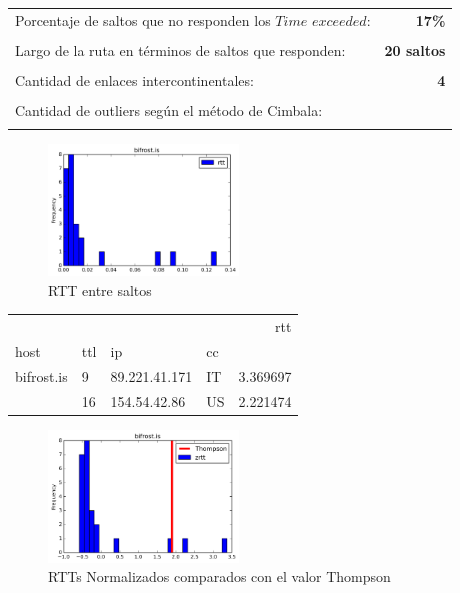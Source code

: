 \begin{center}
\begin{tabular}{p{6.5cm}r}
Porcentaje de saltos que no responden los $Time$ $exceeded$: & \textbf{17\%} \\ \\ 
Largo de la ruta en términos de saltos que responden: &\textbf{20 saltos} \\ \\
Cantidad de enlaces intercontinentales: & \textbf{4} \\ \\
Cantidad de outliers según el método de Cimbala: & \textbf{} \\ \\
\end{tabular}
\end{center}

\begin{figure}[H]
  \centering
    \includegraphics[width=0.45\textwidth]{histogramas_rtt/bifrost-is.png}
  \caption{RTT entre saltos}
  \label{entropia-s}
\end{figure}

\begin{center}
\begin{tabular}{llllr}
\toprule
           &    &               &    &       rtt \\
host & ttl & ip & cc &           \\
\midrule
bifrost.is & 9  & 89.221.41.171 & IT &  3.369697 \\
           & 16 & 154.54.42.86 & US &  2.221474 \\
\bottomrule
\end{tabular}

\end{center}

\begin{figure}[H]
  \centering
    \includegraphics[width=0.45\textwidth]{histogramas_thompson/bifrost-is.png}
  \caption{RTTs Normalizados comparados con el valor Thompson}
  \label{entropia-s}
\end{figure}

